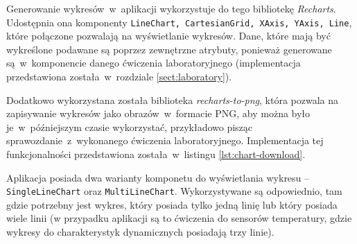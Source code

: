 Generowanie wykresów~w~aplikacji wykorzystuje do tego bibliotekę \textit{Recharts}. Udostępnia ona
komponenty \texttt{LineChart, CartesianGrid, XAxis, YAxis, Line}, które połączone pozwalają na
wyświetlanie wykresów. Dane, które mają być wykreślone podawane są poprzez zewnętrzne atrybuty,
ponieważ generowane są~w~komponencie danego ćwiczenia laboratoryjnego (implementacja przedstawiona
została~w~rozdziale \ref{sect:laboratory}).

Dodatkowo wykorzystana została biblioteka \textit{recharts-to-png}, która pozwala na zapisywanie
wykresów jako obrazów~w~formacie PNG, aby można było je~w~późniejszym czasie wykorzystać,
przykładowo pisząc sprawozdanie~z~wykonanego ćwiczenia laboratoryjnego. Implementacja tej
funkcjonalności przedstawiona została~w~listingu \ref{lst:chart-download}.


Aplikacja posiada dwa warianty komponetu do wyświetlania wykresu -- \texttt{SingleLineChart} oraz
\texttt{MultiLineChart}. Wykorzystywane są odpowiednio, tam gdzie potrzebny jest wykres, który
posiada tylko jedną linię lub który posiada wiele linii (w przypadku aplikacji są to ćwiczenia do
sensorów temperatury, gdzie wykresy do charakterystyk dynamicznych posiadają trzy linie).
